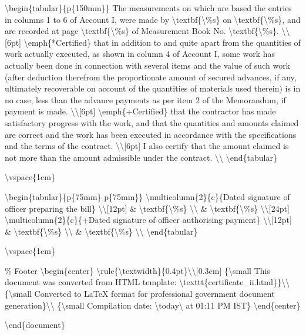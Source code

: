 \textbackslash{}begin\{tabular\}\{p\{150mm\}\}
The measurements on which are based the entries in columns 1 to 6 of Account I, were made by \textbackslash{}textbf\{\textbackslash{}\%s\} on \textbackslash{}textbf\{\textbackslash{}\%s\}, and are recorded at page \textbackslash{}textbf\{\textbackslash{}\%s\} of Measurement Book No. \textbackslash{}textbf\{\textbackslash{}\%s\}. \textbackslash{}\textbackslash{}[6pt]
\textbackslash{}emph\{*Certified\} that in addition to and quite apart from the quantities of work actually executed, as shown in column 4 of Account I, some work has actually been done in connection with several items and the value of such work (after deduction therefrom the proportionate amount of secured advances, if any, ultimately recoverable on account of the quantities of materials used therein) is in no case, less than the advance payments as per item 2 of the Memorandum, if payment is made. \textbackslash{}\textbackslash{}[6pt]
\textbackslash{}emph\{+Certified\} that the contractor has made satisfactory progress with the work, and that the quantities and amounts claimed are correct and the work has been executed in accordance with the specifications and the terms of the contract. \textbackslash{}\textbackslash{}[6pt]
I also certify that the amount claimed is not more than the amount admissible under the contract. \textbackslash{}\textbackslash{}
\textbackslash{}end\{tabular\}

\textbackslash{}vspace\{1cm\}

\textbackslash{}begin\{tabular\}\{p\{75mm\} p\{75mm\}\}
\textbackslash{}multicolumn\{2\}\{c\}\{Dated signature of officer preparing the bill\} \textbackslash{}\textbackslash{}[12pt]
\& \textbackslash{}textbf\{\textbackslash{}\%s\} \textbackslash{}\textbackslash{}
\& \textbackslash{}textbf\{\textbackslash{}\%s\} \textbackslash{}\textbackslash{}[24pt]
\textbackslash{}multicolumn\{2\}\{c\}\{+Dated signature of officer authorising payment\} \textbackslash{}\textbackslash{}[12pt]
\& \textbackslash{}textbf\{\textbackslash{}\%s\} \textbackslash{}\textbackslash{}
\& \textbackslash{}textbf\{\textbackslash{}\%s\} \textbackslash{}\textbackslash{}
\textbackslash{}end\{tabular\}

\textbackslash{}vspace\{1cm\}

\% Footer
\textbackslash{}begin\{center\}
\textbackslash{}rule\{\textbackslash{}textwidth\}\{0.4pt\}\textbackslash{}\textbackslash{}[0.3cm]
\{\textbackslash{}small This document was converted from HTML template: \textbackslash{}texttt\{certificate\_ii.html\}\}\textbackslash{}\textbackslash{}
\{\textbackslash{}small Converted to LaTeX format for professional government document generation\}\textbackslash{}\textbackslash{}
\{\textbackslash{}small Compilation date: \textbackslash{}today\textbackslash{} at 01:11 PM IST\}
\textbackslash{}end\{center\}

\textbackslash{}end\{document\}